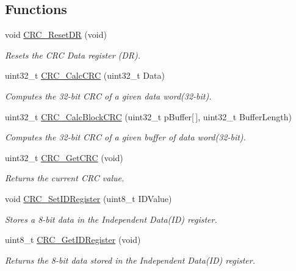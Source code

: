 \subsection*{Functions}
\begin{DoxyCompactItemize}
\item 
void \hyperlink{group___c_r_c_ga506467d5ef873a5a4ade4ae83cb110f6}{C\-R\-C\-\_\-\-Reset\-D\-R} (void)
\begin{DoxyCompactList}\small\item\em Resets the C\-R\-C Data register (D\-R). \end{DoxyCompactList}\item 
uint32\-\_\-t \hyperlink{group___c_r_c_ga5407fdbb8e8c9be6322cc8856ae5db3b}{C\-R\-C\-\_\-\-Calc\-C\-R\-C} (uint32\-\_\-t Data)
\begin{DoxyCompactList}\small\item\em Computes the 32-\/bit C\-R\-C of a given data word(32-\/bit). \end{DoxyCompactList}\item 
uint32\-\_\-t \hyperlink{group___c_r_c_gab15ebf620615c360048fb4f45b15fae6}{C\-R\-C\-\_\-\-Calc\-Block\-C\-R\-C} (uint32\-\_\-t p\-Buffer\mbox{[}$\,$\mbox{]}, uint32\-\_\-t Buffer\-Length)
\begin{DoxyCompactList}\small\item\em Computes the 32-\/bit C\-R\-C of a given buffer of data word(32-\/bit). \end{DoxyCompactList}\item 
uint32\-\_\-t \hyperlink{group___c_r_c_gab62db4561b0558f3c8ed53887fe7de8b}{C\-R\-C\-\_\-\-Get\-C\-R\-C} (void)
\begin{DoxyCompactList}\small\item\em Returns the current C\-R\-C value. \end{DoxyCompactList}\item 
void \hyperlink{group___c_r_c_ga769c9a42be57b972ae61bbada0f2e46a}{C\-R\-C\-\_\-\-Set\-I\-D\-Register} (uint8\-\_\-t I\-D\-Value)
\begin{DoxyCompactList}\small\item\em Stores a 8-\/bit data in the Independent Data(\-I\-D) register. \end{DoxyCompactList}\item 
uint8\-\_\-t \hyperlink{group___c_r_c_gaf869f6e9c3ca0ae0822cfad1abea7e5f}{C\-R\-C\-\_\-\-Get\-I\-D\-Register} (void)
\begin{DoxyCompactList}\small\item\em Returns the 8-\/bit data stored in the Independent Data(\-I\-D) register. \end{DoxyCompactList}\end{DoxyCompactItemize}



